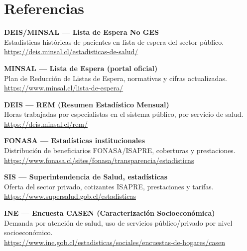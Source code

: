 \documentclass[12pt,a4paper]{article}
\begin{document}
\section*{Referencias}

\begin{enumerate}[leftmargin=1.5cm,label=\textbf{[\arabic*]}]

\item \label{ref:deis} \textbf{DEIS/MINSAL — Lista de Espera No GES}\\
  Estadísticas históricas de pacientes en lista de espera del sector público.\\
  \url{https://deis.minsal.cl/estadisticas-de-salud/}

\item \label{ref:minsal} \textbf{MINSAL — Lista de Espera (portal oficial)}\\
  Plan de Reducción de Listas de Espera, normativas y cifras actualizadas.\\
  \url{https://www.minsal.cl/lista-de-espera/}

\item \label{ref:rem} \textbf{DEIS — REM (Resumen Estadístico Mensual)}\\
  Horas trabajadas por especialistas en el sistema público, por servicio de salud.\\
  \url{https://deis.minsal.cl/rem/}

\item \label{ref:fonasa} \textbf{FONASA — Estadísticas institucionales}\\
  Distribución de beneficiarios FONASA/ISAPRE, coberturas y prestaciones.\\
  \url{https://www.fonasa.cl/sites/fonasa/transparencia/estadisticas}

\item \label{ref:sis} \textbf{SIS — Superintendencia de Salud, estadísticas}\\
  Oferta del sector privado, cotizantes ISAPRE, prestaciones y tarifas.\\
  \url{https://www.supersalud.gob.cl/estadisticas}

\item \label{ref:ine} \textbf{INE — Encuesta CASEN (Caracterización Socioeconómica)}\\
  Demanda por atención de salud, uso de servicios público/privado por nivel socioeconómico.\\
  \url{https://www.ine.gob.cl/estadisticas/sociales/encuestas-de-hogares/casen}


\end{enumerate}
\end{document}
